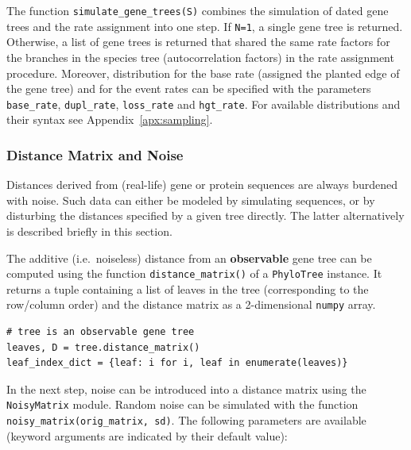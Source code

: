 \documentclass[hidelinks,11pt]{article}
\begin{document}
\noindent
The function \texttt{simulate\_gene\_trees(S)} combines the simulation of dated gene trees and the rate assignment into one step.
If \texttt{N=1}, a single gene tree is returned.
Otherwise, a list of gene trees is returned that shared the same rate factors for the branches in the species tree (autocorrelation factors) in the rate assignment procedure.
Moreover, distribution for the base rate (assigned the planted edge of the
gene tree) and for the event rates can be specified with the parameters
\texttt{base\_rate}, \texttt{dupl\_rate}, \texttt{loss\_rate} and
\texttt{hgt\_rate}.
For available distributions and their syntax see Appendix~\ref{apx:sampling}.


\subsubsection{Distance Matrix and Noise}

Distances derived from (real-life) gene or protein sequences are always burdened with noise.
Such data can either be modeled by simulating sequences, or by disturbing the distances specified by a given tree directly.
The latter alternatively is described briefly in this section.

The additive (i.e.\ noiseless) distance from an \textbf{observable} gene tree can be computed using the function \texttt{distance\_matrix()} of a \texttt{PhyloTree} instance.
It returns a tuple containing a list of leaves in the tree (corresponding to the row/column order) and the distance matrix as a 2-dimensional \texttt{numpy} array.

\begin{adjustwidth}{1cm}{1cm}\vspace{2mm}
\begin{verbatim}
# tree is an observable gene tree
leaves, D = tree.distance_matrix()
leaf_index_dict = {leaf: i for i, leaf in enumerate(leaves)}
\end{verbatim}
\end{adjustwidth}

In the next step, noise can be introduced into a distance matrix using the \texttt{NoisyMatrix} module.
Random noise can be simulated with the function \texttt{noisy\_matrix(orig\_matrix, sd)}.
The following parameters are available (keyword arguments are indicated by their default value):
\end{document}
